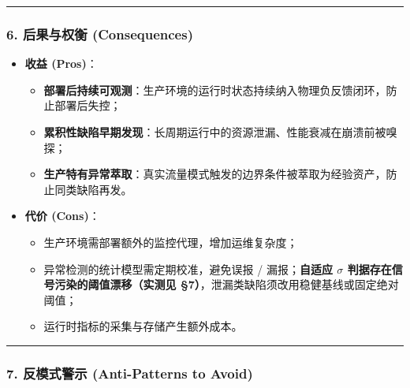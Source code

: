 \documentclass[
]{ctexart}
\renewcommand{\_}{\discretionary{}{}{\textunderscore}}
\begin{document}
\begin{center}\rule{0.5\linewidth}{0.5pt}\end{center}

\subsubsection{6. 后果与权衡
(Consequences)}\label{ux540eux679cux4e0eux6743ux8861-consequences-22}

\begin{itemize}
\item
  \textbf{收益 (Pros)}：

  \begin{itemize}
  \item
    \textbf{部署后持续可观测}：生产环境的运行时状态持续纳入物理负反馈闭环，防止部署后失控；
  \item
    \textbf{累积性缺陷早期发现}：长周期运行中的资源泄漏、性能衰减在崩溃前被嗅探；
  \item
    \textbf{生产特有异常萃取}：真实流量模式触发的边界条件被萃取为经验资产，防止同类缺陷再发。
  \end{itemize}
\item
  \textbf{代价 (Cons)}：

  \begin{itemize}
  \item
    生产环境需部署额外的监控代理，增加运维复杂度；
  \item
    异常检测的统计模型需定期校准，避免误报 / 漏报；\textbf{自适应
    \(\sigma\) 判据存在信号污染的阈值漂移（实测见
    §7）}，泄漏类缺陷须改用稳健基线或固定绝对阈值；
  \item
    运行时指标的采集与存储产生额外成本。
  \end{itemize}
\end{itemize}

\begin{center}\rule{0.5\linewidth}{0.5pt}\end{center}

\subsubsection{7. 反模式警示 (Anti-Patterns to
Avoid)}\label{ux53cdux6a21ux5f0fux8b66ux793a-anti-patterns-to-avoid-22}
\end{document}
